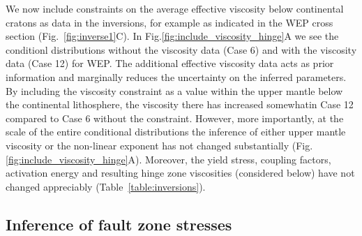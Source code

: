 \documentclass[12pt]{article}
\begin{document}
{We now include constraints on the average effective viscosity below continental cratons as data in the inversions, for example as indicated in
the WEP cross section (Fig.~\ref{fig:inverse1}C).
In Fig.\ref{fig:include_viscosity_hinge}A
we see the conditionl distributions without the viscosity data (Case 6) and 
with the viscosity data (Case 12) for WEP. 
The additional effective viscosity data acts as prior information and marginally reduces the uncertainty on the inferred parameters. 
By including the viscosity constraint as a value within the upper mantle below the continental lithosphere, the viscosity there has increased somewhatin Case 12 compared to Case 6 without the constraint. However, more importantly, at the scale of the entire conditional distributions the inference of either upper mantle viscosity or the non-linear exponent has not changed substantially (Fig.\ref{fig:include_viscosity_hinge}A). 
Moreover, the yield stress, coupling factors, activation energy and resulting hinge zone viscosities (considered below) have not changed appreciably (Table~\ref{table:inversions}).

\subsection{Inference of fault zone stresses}

}
\end{document}
